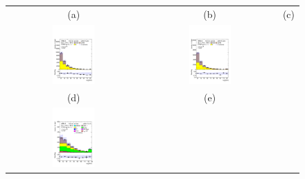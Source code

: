 \begin{figure}[H]
\begin{tabular}{@{}ccc@{}}
(a) & (b) & (c) \\
\includegraphics[page=1,width=0.33\textwidth]{figures/new_pt/reg1l1tau1b2j_os.pdf}&
\includegraphics[page=1,width=0.33\textwidth]{figures/new_pt/reg1l1tau1b3j_os.pdf}\\
(d) & (e) \\
\includegraphics[page=1,width=0.33\textwidth]{figures/new_pt/reg2mtau1b2jos_vetobtagwp70_highmet.pdf}&

\end{tabular}
\end{figure}
